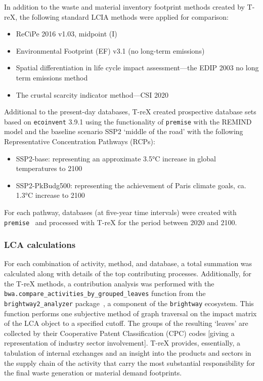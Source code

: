 \documentclass[a4paper,fleqn]{cas-dc}
\renewcommand{\texttt}[1]{{\ttfamily\small\nolinkurl{#1}}}
\begin{document}
In addition to the waste and material inventory footprint methods created by
T-reX, the following standard LCIA methods were applied for comparison:

\begin{itemize}
	\itemsep=0pt
	\item ReCiPe 2016 v1.03, midpoint (I)~\citep{huijbregts2016recipe}
	\item Environmental Footprint (EF) v3.1 (no long-term emissions)~\citep{eu2023ef}
	\item Spatial differentiation in life cycle impact assessment---the EDIP 2003 no long
	      term emissions method~\citep{hauschild2003edip}
	\item The crustal scarcity indicator method---CSI 2020~\citep{arvidsson2020csi}
\end{itemize}

Additional to the present-day databases, T-reX created prospective database
sets based on \texttt{ecoinvent} 3.9.1 using the functionality of
\texttt{premise} with the REMIND model and the baseline scenario SSP2 `middle
of the road' with the following Representative Concentration Pathways (RCPs):
\begin{itemize}
	\item SSP2-base: representing an approximate 3.5°C increase in global temperatures to
	      2100
	\item SSP2-PkBudg500: representing the achievement of Paris climate goals, ca. 1.3°C
	      increase to 2100
\end{itemize}

For each pathway, databases (at five-year time intervals) were created with
\texttt{premise}~\citep{sacchi2022premise} and processed with T-reX for the
period between 2020 and 2100.

\subsubsection{LCA calculations}
For each combination of activity, method, and database, a total summation was
calculated along with details of the top contributing processes. Additionally,
for the T-reX methods, a contribution analysis was performed with the
\texttt{bwa.compare\_activities\_by\_grouped\_leaves} function from the
\texttt{brightway2\_analyzer} package~\citep{mutel2016brightway2analyzer}, a
component of the \texttt{brightway} ecosystem. This function performs one
subjective method of graph traversal on the impact matrix of the LCA object to
a specified cutoff. The groups of the resulting `leaves' are collected by their
Cooperative Patent Classification (CPC) codes [giving a representation of
		industry sector involvement]. T-reX provides, essentially, a tabulation of
internal exchanges and an insight into the products and sectors in the supply
chain of the activity that carry the most substantial responsibility for the
final waste generation or material demand footprints.
\end{document}
